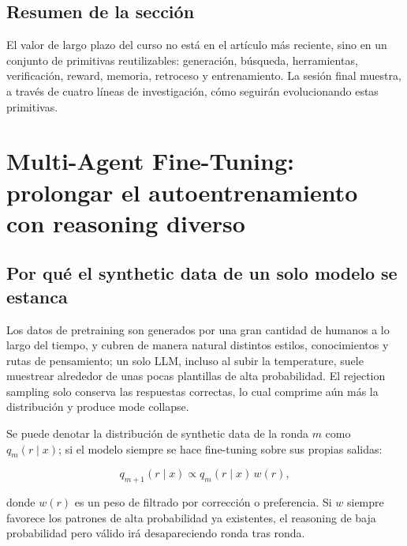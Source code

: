 \documentclass[a4paper]{article}
\begin{document}
\subsection{Resumen de la sección}

El valor de largo plazo del curso no está en el artículo más reciente, sino en un conjunto de primitivas reutilizables: generación, búsqueda, herramientas, verificación, reward, memoria, retroceso y entrenamiento. La sesión final muestra, a través de cuatro líneas de investigación, cómo seguirán evolucionando estas primitivas.
\section{Multi-Agent Fine-Tuning: prolongar el autoentrenamiento con reasoning diverso}

\subsection{Por qué el synthetic data de un solo modelo se estanca}



Los datos de pretraining son generados por una gran cantidad de humanos a lo largo del tiempo, y cubren de manera natural distintos estilos, conocimientos y rutas de pensamiento; un solo LLM, incluso al subir la temperature, suele muestrear alrededor de unas pocas plantillas de alta probabilidad. El rejection sampling solo conserva las respuestas correctas, lo cual comprime aún más la distribución y produce mode collapse.

Se puede denotar la distribución de synthetic data de la ronda $m$ como $q_m(r\mid x)$; si el modelo siempre se hace fine-tuning sobre sus propias salidas:

$$
q_{m+1}(r\mid x)\propto q_m(r\mid x)\,w(r),
$$

donde $w(r)$ es un peso de filtrado por corrección o preferencia. Si $w$ siempre favorece los patrones de alta probabilidad ya existentes, el reasoning de baja probabilidad pero válido irá desapareciendo ronda tras ronda.
\end{document}
